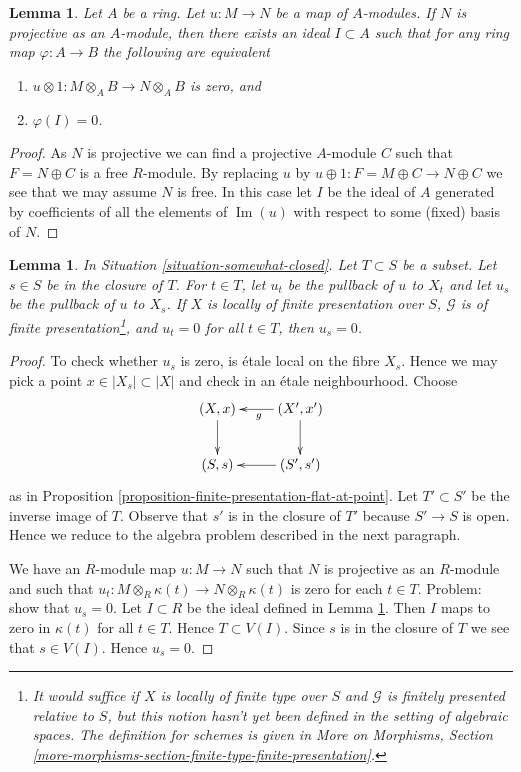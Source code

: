 \documentclass{stacks-project}
\theoremstyle{plain}
\newtheorem{lemma}[subsection]{Lemma}
\theoremstyle{definition}
\theoremstyle{remark}
\numberwithin{equation}{subsection}
\def\Im{\mathop{\mathrm{Im}}}
\begin{document}
\begin{lemma}
\label{lemma-F-zero-module-map}
Let $A$ be a ring. Let $u : M \to N$ be a map of $A$-modules.
If $N$ is projective as an $A$-module, then there exists an ideal
$I \subset A$ such that for any ring map $\varphi : A \to B$
the following are equivalent
\begin{enumerate}
\item $u \otimes 1 : M \otimes_A B \to N \otimes_A B$ is zero, and
\item $\varphi(I) = 0$.
\end{enumerate}
\end{lemma}

\begin{proof}
As $N$ is projective we can find a projective $A$-module $C$
such that $F = N \oplus C$ is a free $R$-module.
By replacing $u$ by $u \oplus 1 : F = M \oplus C \to N \oplus C$
we see that we may assume $N$ is free. In this case let $I$ be
the ideal of $A$ generated by coefficients of all the elements of
$\Im(u)$ with respect to some (fixed) basis of $N$.
\end{proof}

\begin{lemma}
\label{lemma-F-zero-somewhat-closed-points}
In Situation \ref{situation-somewhat-closed}.
Let $T \subset S$ be a subset. Let $s \in S$ be in the closure of $T$.
For $t \in T$, let $u_t$ be the pullback of $u$ to $X_t$
and let $u_s$ be the pullback of $u$ to $X_s$.
If $X$ is locally of finite presentation over $S$,
$\mathcal{G}$ is of finite presentation\footnote{It would
suffice if $X$ is locally of finite type over $S$
and $\mathcal{G}$ is finitely presented relative to $S$,
but this notion hasn't yet been defined in the setting
of algebraic spaces. The definition for schemes is
given in More on Morphisms, Section
\ref{more-morphisms-section-finite-type-finite-presentation}.}, and
$u_t = 0$ for all $t \in T$, then $u_s = 0$.
\end{lemma}

\begin{proof}
To check whether $u_s$ is zero, is \'etale local on the fibre $X_s$.
Hence we may pick a point $x \in |X_s| \subset |X|$ and check
in an \'etale neighbourhood. Choose
$$
\xymatrix{
(X, x) \ar[d] & (X', x') \ar[l]^g \ar[d] \\
(S, s) & (S', s') \ar[l]
}
$$
as in Proposition \ref{proposition-finite-presentation-flat-at-point}.
Let $T' \subset S'$ be the inverse image of $T$. Observe that
$s'$ is in the closure of $T'$ because $S' \to S$ is open.
Hence we reduce to the algebra problem described in the
next paragraph.

\medskip\noindent
We have an $R$-module map $u : M \to N$ such that $N$ is projective
as an $R$-module and such that
$u_t : M \otimes_R \kappa(t) \to N \otimes_R \kappa(t)$
is zero for each $t \in T$. Problem: show that $u_s = 0$.
Let $I \subset R$ be the ideal defined in Lemma \ref{lemma-F-zero-module-map}.
Then $I$ maps to zero in $\kappa(t)$ for all $t \in T$.
Hence $T \subset V(I)$. Since $s$ is in the closure of $T$
we see that $s \in V(I)$. Hence $u_s = 0$.
\end{proof}
\end{document}
